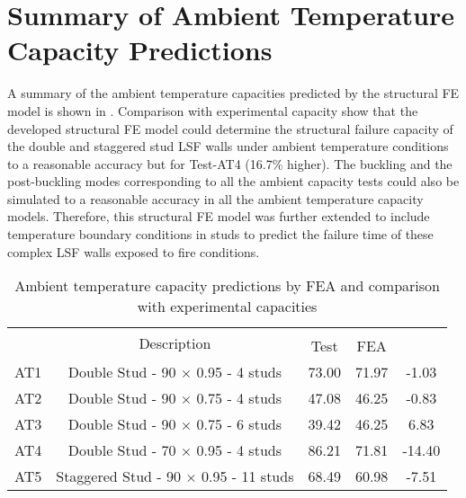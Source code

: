 \section{Summary of Ambient Temperature Capacity Predictions}

A summary of the ambient temperature capacities predicted by the structural FE model is shown in . Comparison with experimental capacity show that the developed structural FE model could determine the structural failure capacity of the double and staggered stud LSF walls under ambient temperature conditions to a reasonable accuracy but for Test-AT4 (16.7\% higher). The buckling and the post-buckling modes corresponding to all the ambient capacity tests could also be simulated to a reasonable accuracy in all the ambient temperature capacity models. Therefore, this structural FE model was further extended to include temperature boundary conditions in studs to predict the failure time of these complex LSF walls exposed to fire conditions. 
\begin{table}[htbp]
	\centering
	\caption{Ambient temperature capacity predictions by FEA and comparison with experimental capacities}
	  \begin{tabular}{ccccc}
	  \toprule
	  \multicolumn{1}{m{3em}}{\multirow{2}{3em}{\centering{Test Name}}} & 
	  \multirow{2}[4]{*}{Description} & 
	  \multicolumn{2}{m{5.075em}}{\centering{Failure capacity (kN)}} & 
	  \multicolumn{1}{m{5em}}{\multirow{2}{4em}{\centering{Ratio of \newline{}FEA/Test capacity}}} \\
  \cmidrule{3-4}          &       & Test  & FEA   &  \\
	  \midrule
	  AT1   & Double Stud - 90 $\times$ 0.95 - 4 studs & 73.00 & 71.97 & -1.03 \\
	  AT2   & Double Stud - 90 $\times$ 0.75 - 4 studs & 47.08 & 46.25 & -0.83 \\
	  AT3   & Double Stud - 90 $\times$ 0.75 - 6 studs & 39.42 & 46.25 & 6.83 \\
	  AT4   & Double Stud - 70 $\times$ 0.95 - 4 studs & 86.21 & 71.81 & -14.40 \\
	  AT5   & Staggered  Stud - 90 $\times$ 0.95 - 11 studs & 68.49 & 60.98 & -7.51 \\
	  \bottomrule
	  \end{tabular}%
	\label{tab:ambient-test-results-fea}%
  \end{table}%
  
